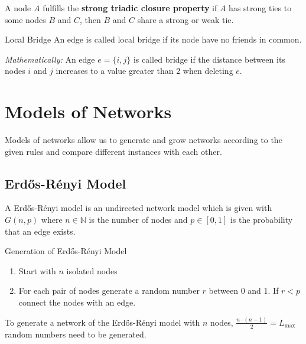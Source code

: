 \documentclass[english]{panikzettel}
\begin{document}
A node $ A $ fulfills the \textbf{strong triadic closure property} if $ A $ has strong ties to some nodes $ B $ and $ C $, then $ B $ and $ C $ share a strong or weak tie.

\begin{defi}{Local Bridge}
	An edge is called local bridge if its node have no friends in common.
	
	\textit{Mathematically:} An edge $ e = \{i,j\} $ is called bridge if the distance between its nodes $ i $ and $ j $ increases to a value greater than 2 when deleting $ e $.
\end{defi}

\section{Models of Networks}
Models of networks allow us to generate and grow networks according to the given rules and compare different instances with each other.

\newcommand{\erdosrenyi}{Erd\H{o}s-Rényi }
\subsection{\erdosrenyi Model} \label{sec:erdosrenyi_model}
A \erdosrenyi model is an undirected network model which is given with $ G(n,p) $ where $ n \in \mathbb{N} $ is the number of nodes and $ p \in [0,1] $ is the probability that an edge exists.

\begin{algo}{Generation of \erdosrenyi Model}
\begin{enumerate}
	\item Start with $ n $ isolated nodes
	\item For each pair of nodes generate a random number $ r $ between 0 and 1. If $ r < p $ connect the nodes with an edge.
\end{enumerate}
\end{algo}

To generate a network of the \erdosrenyi model with $ n $ nodes, \hyperref[sec:max_number_links]{$ \frac{n \cdot (n - 1)}{2} = L_\text{max} $} random numbers need to be generated.
\end{document}
